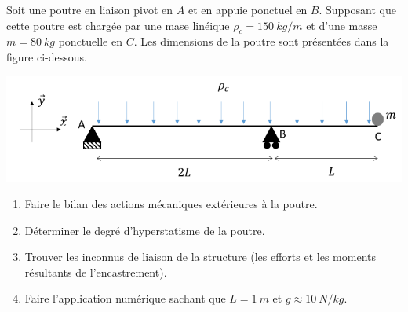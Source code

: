 \documentclass[lecture.tex]{subfiles}
\begin{document}
\exercice{}


Soit une poutre en liaison pivot en $A$ et en appuie ponctuel en $B$. Supposant que cette poutre est chargée par une mase linéique $\rho_c = 150 \ kg/m$ et d'une masse $m=80 \ kg$ ponctuelle en $C$. Les dimensions de la poutre sont présentées dans la figure ci-dessous.

\begin{center}
  \includegraphics[scale=0.4]{exo-poutre-en-appuie.png}
\end{center}

\begin{enumerate}
  \item Faire le bilan des actions mécaniques extérieures à la poutre.
  \item Déterminer le degré d’hyperstatisme de la poutre.
  \item Trouver les inconnus de liaison de la structure (les efforts et les moments résultants de l’encastrement).
  \item Faire l’application numérique sachant que $L=1 \ m$ et $g\approx10 \ N/kg$.
\end{enumerate}

\finexercice
\end{document}
